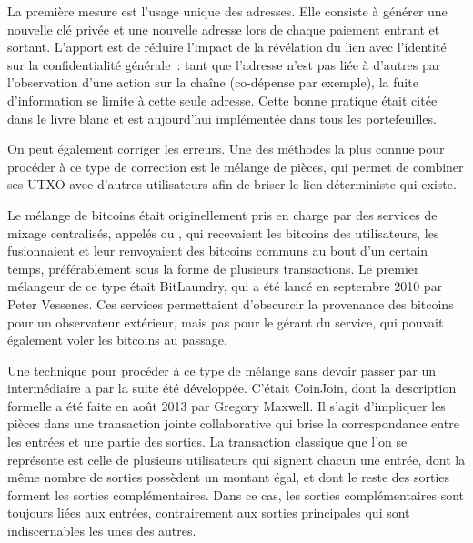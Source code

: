 La première mesure est l'usage unique des adresses. Elle consiste à générer une nouvelle clé privée et une nouvelle adresse lors de chaque paiement entrant et sortant. L'apport est de réduire l'impact de la révélation du lien avec l'identité sur la confidentialité générale~: tant que l'adresse n'est pas liée à d'autres par l'observation d'une action sur la chaîne (co-dépense par exemple), la fuite d'information se limite à cette seule adresse. Cette bonne pratique était citée dans le livre blanc et est aujourd'hui implémentée dans tous les portefeuilles.

On peut également corriger les erreurs. Une des méthodes la plus connue pour procéder à ce type de correction est le mélange de pièces, qui permet de combiner ses UTXO avec d'autres utilisateurs afin de briser le lien déterministe qui existe.

Le mélange de bitcoins était originellement pris en charge par des services de mixage centralisés, appelés  ou , qui recevaient les bitcoins des utilisateurs, les fusionnaient et leur renvoyaient des bitcoins communs au bout d'un certain temps, préférablement sous la forme de plusieurs transactions. Le premier mélangeur de ce type était BitLaundry, qui a été lancé en septembre 2010 par Peter Vessenes. Ces services permettaient d'obscurcir la provenance des bitcoins pour un observateur extérieur, mais pas pour le gérant du service, qui pouvait également voler les bitcoins au passage.  %

Une technique pour procéder à ce type de mélange sans devoir passer par un intermédiaire a par la suite été développée. C'était CoinJoin, dont la description formelle a été faite en août 2013 par Gregory Maxwell. Il s'agit d'impliquer les pièces dans une transaction jointe collaborative qui brise la correspondance entre les entrées et une partie des sorties. La transaction classique que l'on se représente est celle de plusieurs utilisateurs qui signent chacun une entrée, dont la même nombre de sorties possèdent un montant égal, et dont le reste des sorties forment les sorties complémentaires. Dans ce cas, les sorties complémentaires sont toujours liées aux entrées, contrairement aux sorties principales qui sont indiscernables les unes des autres.

